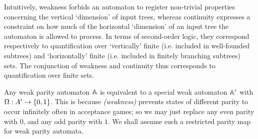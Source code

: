 
Intuitively, weakness forbids an automaton to register non-trivial properties 
concerning the vertical `dimension' of input trees, whereas continuity expresses
a constraint on how much of the horizontal `dimension' of an input tree the 
automaton is allowed to process. 
In terms of second-order logic, they correspond respectively to quantification 
over `vertically' finite (i.e. included in well-founded subtrees) and 
`horizontally' finite (i.e. included in finitely branching subtrees) sets. 
The conjunction of weakness and continuity thus corresponds to quantification 
over finite sets. 

\begin{remark}\label{rmk:weak01}
Any weak parity automaton $\mathbb{A}$ is equivalent to a special weak automaton
$\mathbb{A}'$ with $\Omega: A' \to \{0,1\}$. 
This is because \emph{(weakness)} prevents states of different parity to occur
infinitely often in acceptance games; so we may just replace any even parity 
with $0$, and any odd parity with $1$.
We shall assume such a restricted parity map for weak parity automata.
\end{remark}


